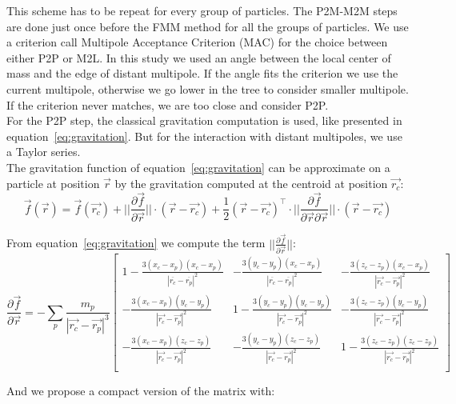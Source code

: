 This scheme has to be repeat for every group of particles. 
The P2M-M2M steps are done just once before the FMM method for all the groups of particles.
We use a criterion call Multipole Acceptance Criterion (MAC) for the choice between either P2P or M2L. 	
In this study we used an angle between the local center of mass and the edge of distant multipole. 
If the angle fits the criterion we use the current multipole, otherwise we go lower in the tree to consider smaller multipole.
If the criterion never matches, we are too close and consider P2P.\\

For the P2P step, the classical gravitation computation is used, like presented in equation~\ref{eq:gravitation}.
But for the interaction with distant multipoles, we use a Taylor series.\\
The gravitation function of equation~\ref{eq:gravitation} can be approximate on a particle at position $\vec{r}$ by the gravitation computed at the centroid at position $\vec{r_c}$: 
\begin{equation}
\label{eq:taylor_series}
 \vec{f}(\vec{r}) = \vec{f}(\vec{r_c}) + ||\frac{\partial\vec{f}}{\partial\vec{r}}||\cdot (\vec{r} - \vec{r_c}) + \frac{1}{2} (\vec{r}-\vec{r_c})^\intercal \cdot   ||\frac{\partial\vec{f}}{\partial\vec{r} \partial\vec{r}}|| \cdot (\vec{r} - \vec{r_c})
 \end{equation}

 From equation~\ref{eq:gravitation} we compute the term $||\frac{\partial\vec{f}}{\partial\vec{r}}||$:
 \begin{equation}
\frac{\partial\vec{f}}{\partial\vec{r}} =
- \sum_p \frac{m_p}{|\vec{r_c}-\vec{r_p}|^3}
\begin{bmatrix}
1 - \frac{3(x_c-x_p)(x_c-x_p)}{|\overline{r_c}-\overline{r_p}|^2} & -\frac{3(y_c-y_p)(x_c-x_p)}{|\overline{r_c}-\overline{r_p}|^2}  & -\frac{3(z_c-z_p)(x_c-x_p)}{|\vec{r_c}-\vec{r_p}|^2}  \\
-\frac{3(x_c-x_p)(y_c-y_p)}{|\vec{r_c}-\vec{r_p}|^2}  & 1 - \frac{3(y_c-y_p)(y_c-y_p)}{|\vec{r_c}-\vec{r_p}|^2} &  -\frac{3(z_c-z_p)(y_c-y_p)}{|\vec{r_c}-\vec{r_p}|^2}\\
- \frac{3(x_c-x_p)(z_c-z_p)}{|\vec{r_c}-\vec{r_p}|^2}   &  -\frac{3(y_c-y_p)(z_c-z_p)}{|\vec{r_c}-\vec{r_p}|^2} &  1- \frac{3(z_c-z_p)(z_c-z_p)}{|\vec{r_c}-\vec{r_p}|^2} \\
\end{bmatrix}
\end{equation}

And we propose a compact version of the matrix with: 
 
